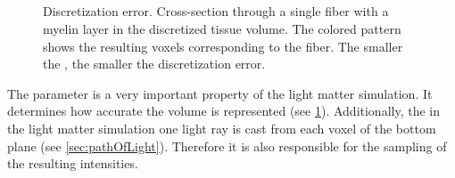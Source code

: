 \subsection{\Voxelsize}
%
\begin{figure}[!t]
\centering
\setlength{\tikzwidth}{.24\textwidth}

\caption{Discretization error. Cross-section through a single fiber with a myelin layer in the discretized tissue volume. The colored pattern shows the resulting voxels corresponding to the fiber. The smaller the \Voxelsize, the smaller the discretization error.}
\label{fig:vectorfield_disc_error}
\end{figure}
%
The parameter \Voxelsize{} is a very important property of the light matter simulation.
It determines how accurate the volume is represented (see \cref{fig:vectorfield_disc_error}).
Additionally, the in the light matter simulation one light ray is cast from each voxel of the bottom plane (see \cref{sec:pathOfLight}). 
Therefore it is also responsible for the sampling of the resulting intensities.
%
%
% 
